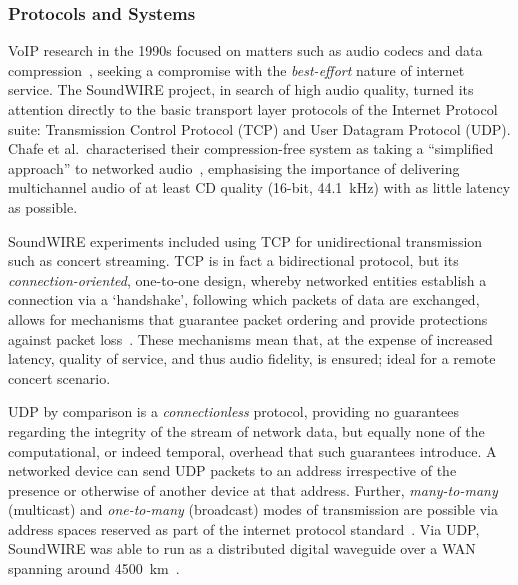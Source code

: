 \subsubsection{Protocols and Systems}\label{subsubsec:protocols-systems}

VoIP research in the 1990s focused on matters such as audio codecs and data
compression~\citep{turletti_inria_1995,hardman_successful_1998}, seeking a
compromise with the \textit{best-effort} nature of internet service.
The SoundWIRE project, in search of high audio quality, turned its attention
directly to the basic transport layer protocols of the Internet Protocol suite:
Transmission Control Protocol (TCP) and User Datagram Protocol (UDP).
Chafe et al.\ characterised their compression-free system as taking a
``simplified approach'' to networked audio~\citep{chafe_simplified_2000},
emphasising the importance of delivering multichannel audio of at least CD
quality (16-bit, \qty{44.1}{\kHz}) with as little latency as possible.

SoundWIRE experiments included using TCP for unidirectional transmission such as
concert streaming.
TCP is in fact a bidirectional protocol, but its \textit{connection-oriented},
one-to-one design, whereby networked entities establish a connection via a
`handshake', following which packets of data are exchanged, allows for
mechanisms that guarantee packet ordering and provide protections against packet
loss~\citep{schiavoni_alternatives_2013,al-dhief_performance_2018}.
These mechanisms mean that, at the expense of increased latency, quality of
service, and thus audio fidelity, is ensured; ideal for a remote concert
scenario.

UDP by comparison is a \textit{connectionless} protocol, providing no guarantees
regarding the integrity of the stream of network data, but equally none of the
computational, or indeed temporal, overhead that such guarantees introduce.
A networked device can send UDP packets to an address irrespective of the
presence or otherwise of another device at that address.
Further, \textit{many-to-many} (multicast) and \textit{one-to-many} (broadcast)
modes of transmission are possible via address spaces reserved as part of the
internet protocol standard~\citep{meyer_iana_2010}.
Via UDP, SoundWIRE was able to run as a distributed digital waveguide over a
WAN spanning around \qty{4500}{\km}~\citep{chafe_simplified_2000}.

